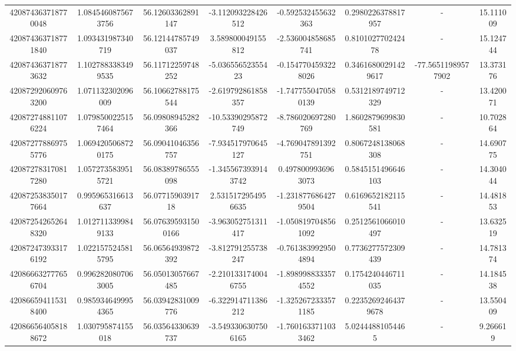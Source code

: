 \documentclass{article}
\begin{document}
\begin{landscape}
\begin{longtable}[c]{S[table-format=18.0]S[table-format=2.15]S[table-format=2.15]S[table-format=-2.17]S[table-format=-2.16]S[table-format=-2.16]S[table-format=-3.16]S[table-format=2.7]}
420874363718770048 & 1.0845460875673756 & 56.12603362891147  & -3.112093228426512   & -0.592532455632363     & 0.2980226378817957  & {-}                  & 15.111009  \\
420874363718771840 & 1.093431987340719  & 56.12144785749037  & 3.589800049155812    & -2.536004858685741     & 0.810102770242478   & {-}                  & 15.124744  \\
420874363718773632 & 1.1027883383499535 & 56.11712259748252  & -5.03655652355423    & -0.1547704593228026    & 0.34616800291429617 & -77.56511989577902  & 13.373176  \\
420872920609763200 & 1.071132302096009  & 56.10662788175544  & -2.619792861858357   & -1.7477550470580139    & 0.5312189749712329  & {-}                  & 13.420071  \\
420872748811076224 & 1.0798500225157464 & 56.09808945282366  & -10.53390295872749   & -8.786020697280769     & 1.8602879699830581  & {-}                  & 10.702864  \\
420872778869755776 & 1.0694205068720175 & 56.09041046356757  & -7.934517970645127   & -4.769047891392751     & 0.8067248138068308  & {-}                  & 14.690775  \\
420872783170817280 & 1.0572735839515721 & 56.08389786555098  & -1.3455673939143742  & 0.4978009936963073     & 0.5845151496646103  & {-}                  & 14.304044  \\
420872538350177664 & 0.995965316613637  & 56.0771590391718   & 2.5315172954956635   & -1.2318776864279504    & 0.6169652182115541  & {-}                  & 14.481853  \\
420872542652648320 & 1.0127113399849133 & 56.076395931500166 & -3.963052751311417   & -1.0508197048561092    & 0.2512561066010497  & {-}                  & 13.632519  \\
420872473933176192 & 1.0221575245815795 & 56.06564939872392  & -3.812791255738247   & -0.7613839929504894    & 0.7736277572309439  & {-}                  & 14.781374  \\
420866632777656704 & 0.9962820807063005 & 56.05013057667485  & -2.2101331740046755  & -1.8989988333574552    & 0.1754240446711035  & {-}                  & 14.184538  \\
420866594115318400 & 0.9859346499954365 & 56.03942831009776  & -6.322914711386212   & -1.3252672333571185    & 0.22352692464379678 & {-}                  & 13.550409  \\
420866564058188672 & 1.030795874155018  & 56.03564330639737  & -3.5493306307506165  & -1.7601633711033462    & 5.02444881054465    & {-}                  & 9.266619   \\

\end{longtable}
\end{landscape}
\end{document}
